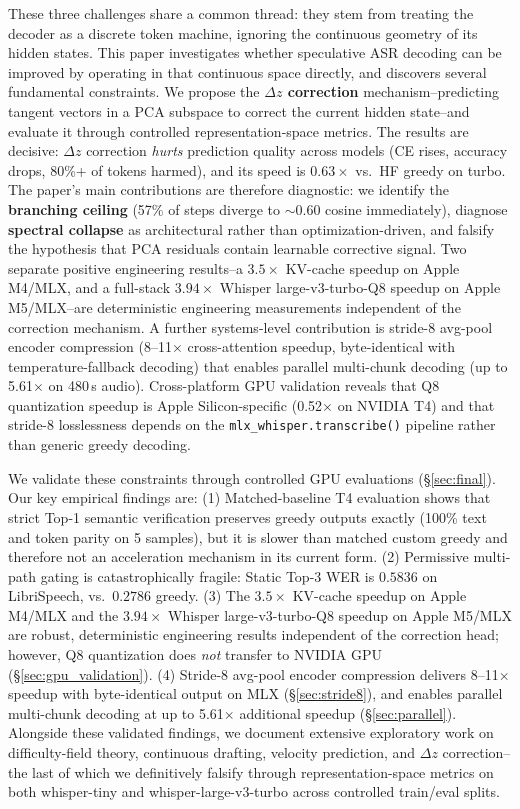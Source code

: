 \documentclass[11pt,a4paper]{article}
\begin{document}
These three challenges share a common thread: they stem from treating the decoder as a discrete token machine, ignoring the continuous geometry of its hidden states.
This paper investigates whether speculative ASR decoding can be improved by operating in that continuous space directly, and discovers several fundamental constraints.
We propose the \textbf{$\Delta z$ correction} mechanism--predicting tangent vectors in a PCA subspace to correct the current hidden state--and evaluate it through controlled representation-space metrics.
The results are decisive: $\Delta z$ correction \emph{hurts} prediction quality across models (CE rises, accuracy drops, 80\%+ of tokens harmed), and its speed is $0.63\times$ vs.\ HF greedy on turbo.
The paper's main contributions are therefore diagnostic: we identify the \textbf{branching ceiling} (57\% of steps diverge to ${\sim}0.60$ cosine immediately), diagnose \textbf{spectral collapse} as architectural rather than optimization-driven, and falsify the hypothesis that PCA residuals contain learnable corrective signal.
Two separate positive engineering results--a $3.5\times$ KV-cache speedup on Apple M4/MLX, and a full-stack $3.94\times$ Whisper large-v3-turbo-Q8 speedup on Apple M5/MLX--are deterministic engineering measurements independent of the correction mechanism.
A further systems-level contribution is stride-8 avg-pool encoder compression (8--11$\times$ cross-attention speedup, byte-identical with temperature-fallback decoding) that enables parallel multi-chunk decoding (up to 5.61$\times$ on 480\,s audio).
Cross-platform GPU validation reveals that Q8 quantization speedup is Apple Silicon-specific (0.52$\times$ on NVIDIA T4) and that stride-8 losslessness depends on the \texttt{mlx\_whisper.transcribe()} pipeline rather than generic greedy decoding.

We validate these constraints through controlled GPU evaluations (\S\ref{sec:final}). Our key empirical findings are:
(1) Matched-baseline T4 evaluation shows that strict Top-1 semantic verification preserves greedy outputs exactly (100\% text and token parity on 5 samples), but it is slower than matched custom greedy and therefore not an acceleration mechanism in its current form.
(2) Permissive multi-path gating is catastrophically fragile: Static Top-3 WER is $0.5836$ on LibriSpeech, vs.\ $0.2786$ greedy.
(3) The $3.5\times$ KV-cache speedup on Apple M4/MLX and the $3.94\times$ Whisper large-v3-turbo-Q8 speedup on Apple M5/MLX are robust, deterministic engineering results independent of the correction head; however, Q8 quantization does \emph{not} transfer to NVIDIA GPU (\S\ref{sec:gpu_validation}).
(4) Stride-8 avg-pool encoder compression delivers 8--11$\times$ speedup with byte-identical output on MLX (\S\ref{sec:stride8}), and enables parallel multi-chunk decoding at up to 5.61$\times$ additional speedup (\S\ref{sec:parallel}).
Alongside these validated findings, we document extensive exploratory work on difficulty-field theory, continuous drafting, velocity prediction, and $\Delta z$ correction--the last of which we definitively falsify through representation-space metrics on both whisper-tiny and whisper-large-v3-turbo across controlled train/eval splits.
\end{document}
